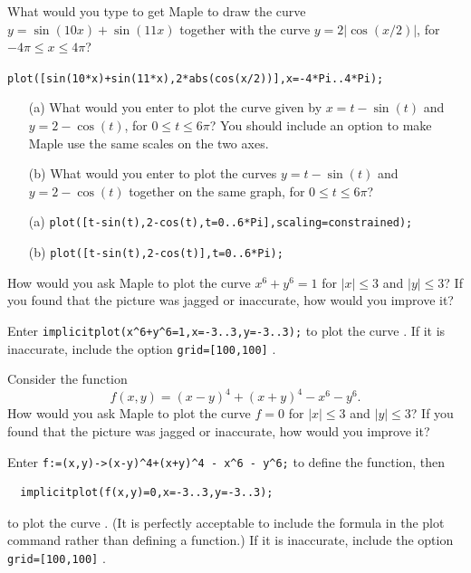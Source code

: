 \documentclass[a4paper]{article}
\begin{document}
\begin{problem}
 What would you type to get Maple to draw the curve
 $y=\sin(10x)+\sin(11x)$ together with the curve $y=2|\cos(x/2)|$, for
 $-4\pi\leq x\leq 4\pi$? 
\end{problem}
\begin{solution}
 \verb~plot([sin(10*x)+sin(11*x),2*abs(cos(x/2))],x=-4*Pi..4*Pi);~ 
\end{solution}

\begin{problem}
 \begin{itemize}
  \item[(a)] What would you enter to plot the curve given by
   $x=t-\sin(t)$ and $y=2-\cos(t)$, for $0\leq t\leq 6\pi$?
   You should include an option to make Maple use the same
   scales on the two axes. 
  \item[(b)] What would you enter to plot the curves
   $y=t-\sin(t)$ and $y=2-\cos(t)$ together on the same
   graph, for $0\leq t\leq 6\pi$? 
 \end{itemize}
\end{problem}
\begin{solution}
 \begin{itemize}
  \item[(a)]
   \verb~plot([t-sin(t),2-cos(t),t=0..6*Pi],scaling=constrained);~
  \item[(b)]
   \verb~plot([t-sin(t),2-cos(t)],t=0..6*Pi);~
 \end{itemize}
\end{solution}


\begin{problem}\label{ex-implicitplot-i}
 How would you ask Maple to plot the curve $x^6+y^6=1$ for
 $|x|\leq 3$ and $|y|\leq 3$?  If you found that the picture
 was jagged or inaccurate, how would you improve it? 
\end{problem}
\begin{solution}
 Enter \verb~implicitplot(x^6+y^6=1,x=-3..3,y=-3..3);~ to
 plot the curve .  If it is inaccurate, include the option
 \verb~grid=[100,100]~ . 
\end{solution}

\begin{problem}
 Consider the function
 \[ f(x,y) = (x-y)^4+(x+y)^4 - x^6 - y^6. \]
 How would you ask Maple to plot the curve $f=0$ for
 $|x|\leq 3$ and $|y|\leq 3$?  If you found that the picture
 was jagged or inaccurate, how would you improve it? 
\end{problem}
\begin{solution}
 Enter \verb~f:=(x,y)->(x-y)^4+(x+y)^4 - x^6 - y^6;~ to
 define the function, then
 \begin{verbatim}
  implicitplot(f(x,y)=0,x=-3..3,y=-3..3);
 \end{verbatim}
 to plot the curve .  (It is perfectly acceptable to
 include the formula in the plot command rather than defining
 a function.)  If it is inaccurate, include the option
 \verb~grid=[100,100]~ . 
\end{solution}
\end{document}
